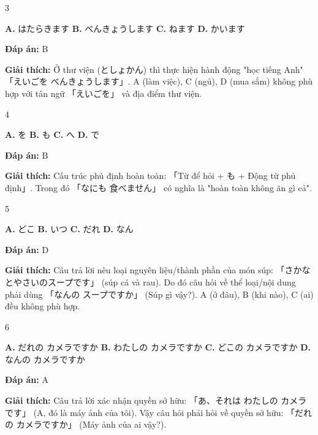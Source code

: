 \documentclass[12pt,a4paper]{report}
\newcommand{\source}[1]{}
\newcommand{\choice}[2]{\textbf{#1.} #2 \quad}
\newcommand{\answer}[1]{\par\textbf{Đáp án:} #1}
\newcommand{\confidence}[1]{}
\newcommand{\explain}[1]{\par\textbf{Giải thích:} #1\vspace{0.5cm}}
\begin{document}
\begin{question}{3}
\source{Q6_146_20251121082809.webp}
\choice{A}{はたらきます}
\choice{B}{べんきょうします}
\choice{C}{ねます}
\choice{D}{かいます}
\answer{B}
\confidence{high}
\explain{Ở thư viện (としょかん) thì thực hiện hành động "học tiếng Anh" 「えいごを べんきょうします」. A (làm việc), C (ngủ), D (mua sắm) không phù hợp với tân ngữ 「えいごを」 và địa điểm thư viện.}
\end{question}

\begin{question}{4}
\source{Q8_61_20251121082812.webp}
\choice{A}{を}
\choice{B}{も}
\choice{C}{へ}
\choice{D}{で}
\answer{B}
\confidence{high}
\explain{Cấu trúc phủ định hoàn toàn: 「Từ để hỏi + も + Động từ phủ định」. Trong đó 「なにも 食べません」 có nghĩa là "hoàn toàn không ăn gì cả".}
\end{question}

\begin{question}{5}
\source{Q11_36_20251121082816.webp}
\choice{A}{どこ}
\choice{B}{いつ}
\choice{C}{だれ}
\choice{D}{なん}
\answer{D}
\confidence{high}
\explain{Câu trả lời nêu loại nguyên liệu/thành phần của món súp: 「さかなとやさいのスープです」 (súp cá và rau). Do đó câu hỏi về thể loại/nội dung phải dùng 「なんの スープですか」 (Súp gì vậy?). A (ở đâu), B (khi nào), C (ai) đều không phù hợp.}
\end{question}

\begin{question}{6}
\source{Q15_21_20251121082822.webp}
\choice{A}{だれの カメラですか}
\choice{B}{わたしの カメラですか}
\choice{C}{どこの カメラですか}
\choice{D}{なんの カメラですか}
\answer{A}
\confidence{high}
\explain{Câu trả lời xác nhận quyền sở hữu: 「あ、それは わたしの カメラです」 (A, đó là máy ảnh của tôi). Vậy câu hỏi phải hỏi về quyền sở hữu: 「だれの カメラですか」 (Máy ảnh của ai vậy?).}
\end{question}
\end{document}
